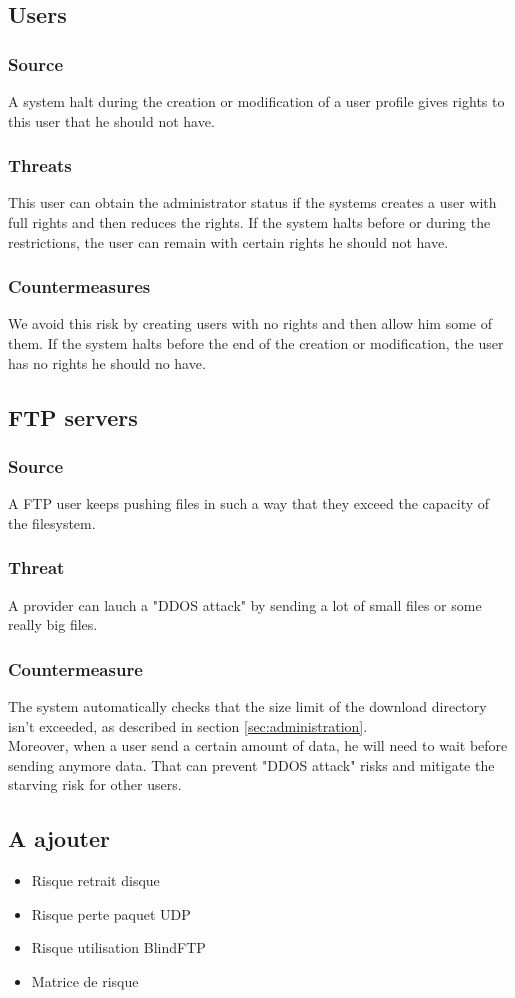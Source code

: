\documentclass[a4paper,11pt]{article}
\begin{document}
\subsection{Users}
\subsubsection{Source}
A system halt during the creation or modification of a user profile gives rights to this user that he should not have.
\subsubsection{Threats}
This user can obtain the administrator status if the systems creates a user with full rights and then reduces the rights. If the system halts before or during the restrictions, the user can remain with certain rights he should not have.
\subsubsection{Countermeasures}
We avoid this risk by creating users with no rights and then allow him some of them. If the system halts before the end of the creation or modification, the user has no rights he should no have.  
\subsection{FTP servers}


\subsubsection{Source}
A FTP user keeps pushing files in such a way that they exceed the capacity of the filesystem.

\subsubsection{Threat}
A provider can lauch a "DDOS attack" by sending a lot of small files or some really big files.
\subsubsection{Countermeasure}
The system automatically checks that the size limit of the download directory isn't exceeded, as described in section  \ref{sec:administration}.\\

Moreover, when a user send a certain amount of data, he will need to wait before sending anymore data. That can prevent "DDOS attack" risks and mitigate the starving risk for other users.
\subsection{A ajouter}
\begin{itemize}
\item Risque retrait disque
\item Risque perte paquet UDP
\item Risque utilisation BlindFTP
\item Matrice de risque 
\end{itemize}
\end{document}
